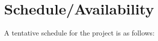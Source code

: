 \documentclass[a4paper,12pt,oneside]{article}
\begin{document}
\section{Schedule/Availability}
A tentative schedule for the project is as follows: 
\end{document}

